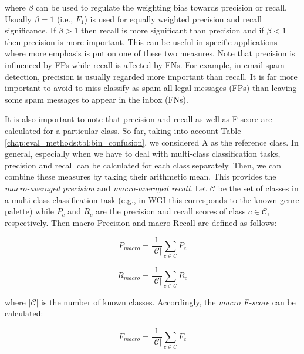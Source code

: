 \noindent
where $\beta$ can be used to regulate the weighting bias towards precision or recall. Usually $\beta = 1$ (i.e., $F_{1}$) is used for equally weighted precision and recall significance. If $\beta > 1$ then recall is more significant than precision and if $\beta < 1$ then precision is more important. This can be useful in specific applications where more emphasis is put on one of these two measures. Note that precision is influenced by FPs while recall is affected by FNs. For example, in email spam detection, precision is usually regarded more important than recall. It is far more important to avoid to miss-classify as spam all legal messages (FPs) than leaving some spam messages to appear in the inbox (FNs).

It is also important to note that precision and recall as well as F-score are calculated for a particular class. So far, taking into account Table \ref{chap:eval_methods:tbl:bin_confusion}, we considered A as the reference class. In general, especially when we have to deal with multi-class classification tasks, precision and recall can be calculated for each class separately. Then, we can combine these measures by taking their arithmetic mean. This provides the \textit{macro-averaged precision} and \textit{macro-averaged recall}. Let $\mathcal{C}$ be the set of classes in a multi-class classification task (e.g., in WGI this corresponds to the known genre palette) while $P_c$ and $R_c$ are the precision and recall scores of class $c \in \mathcal{C}$, respectively. Then macro-Precision and macro-Recall are defined as follows:

\begin{equation}\label{chap:eval_methods:eq:macro-precision}
	P_{macro} = \frac{1}{|\mathcal{C}|} \sum_{c \in \mathcal{C}}{P_c}
\end{equation}

\begin{equation}\label{chap:eval_methods:eq:macro-recall}
	R_{macro} = \frac{1}{|\mathcal{C}|} \sum_{c \in \mathcal{C}}{R_c}
\end{equation}

\noindent 
where $|\mathcal{C}|$ is the number of known classes. Accordingly, the \textit{macro F-score} can be calculated: 

\begin{equation}\label{chap:eval_methods:eq:macro-F}
	F_{macro} = \frac{1}{|\mathcal{C}|} \sum_{c \in \mathcal{C}}{F_c}
\end{equation}

